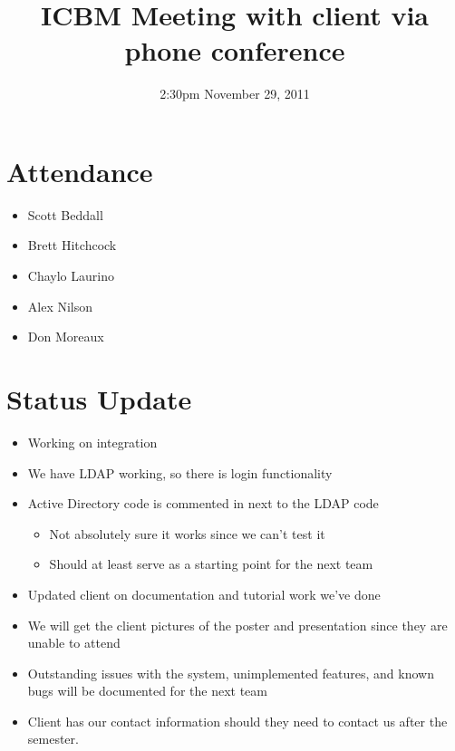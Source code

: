 \documentclass{article}
\begin{document}
\title{ICBM Meeting with client via phone conference}
\date{2:30pm November 29, 2011}
\maketitle

\section{Attendance}
\begin{itemize}
\item Scott Beddall
\item Brett Hitchcock
\item Chaylo Laurino
\item Alex Nilson
\item Don Moreaux
\end{itemize}

\section{Status Update}
\begin{itemize}
\item Working on integration
\item We have LDAP working, so there is login functionality
\item Active Directory code is commented in next to the LDAP code
	\begin{itemize}
	\item Not absolutely sure it works since we can't test it
	\item Should at least serve as a starting point for the next team
	\end{itemize}
\item Updated client on documentation and tutorial work we've done
\item We will get the client pictures of the poster and presentation since they are unable to attend
\item Outstanding issues with the system, unimplemented features, and known bugs will be documented for the next team
\item Client has our contact information should they need to contact us after the semester.
\end{itemize}
\end{document}
